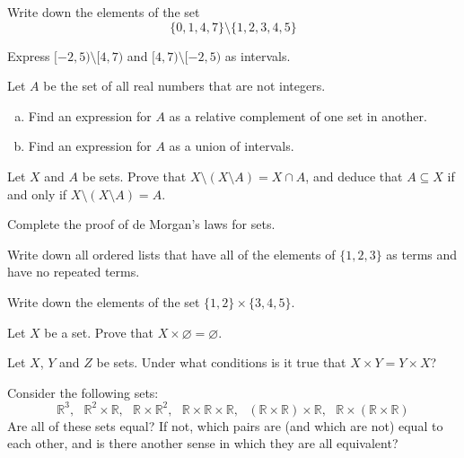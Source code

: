 \begin{exercise}
Write down the elements of the set
\[ \{ 0, 1, 4, 7 \} \setminus \{ 1, 2, 3, 4, 5 \} \]
\end{exercise}

\begin{exercise}
Express $[-2,5) \setminus [4,7)$ and $[4,7) \setminus [-2,5)$ as intervals.
\end{exercise}

\begin{exercise}
Let $A$ be the set of all real numbers that are not integers.
\begin{enumerate}[(a)]
\item Find an expression for $A$ as a relative complement of one set in another.
\item Find an expression for $A$ as a union of intervals.
\end{enumerate}
\end{exercise}

\begin{exercise}
\label{exSetMinusSetMinus}
Let $X$ and $A$ be sets. Prove that $X \setminus (X \setminus A) = X \cap A$, and deduce that $A \subseteq X$ if and only if $X \setminus (X \setminus A) = A$.
\end{exercise}

\begin{exercise}
Complete the proof of de Morgan's laws for sets.
\end{exercise}


\begin{exercise}
Write down all ordered lists that have all of the elements of $\{ 1, 2, 3 \}$ as terms and have no repeated terms.
\end{exercise}


\begin{exercise}
Write down the elements of the set $\{ 1, 2 \} \times \{ 3, 4, 5 \}$.
\end{exercise}

\begin{exercise}
Let $X$ be a set. Prove that $X \times \varnothing = \varnothing$.
\end{exercise}

\begin{exercise}
\label{exCartesianProductNotCommutative}
Let $X$, $Y$ and $Z$ be sets. Under what conditions is it true that $X \times Y = Y \times X$?
\end{exercise}


\begin{exercise}
Consider the following sets:
\[ \mathbb{R}^3, ~~~ \mathbb{R}^2 \times \mathbb{R}, ~~~ \mathbb{R} \times \mathbb{R}^2, ~~~ \mathbb{R} \times \mathbb{R} \times \mathbb{R}, ~~~ (\mathbb{R} \times \mathbb{R}) \times \mathbb{R}, ~~~ \mathbb{R} \times (\mathbb{R} \times \mathbb{R}) \]
Are all of these sets equal? If not, which pairs are (and which are not) equal to each other, and is there another sense in which they are all equivalent?
\end{exercise}

